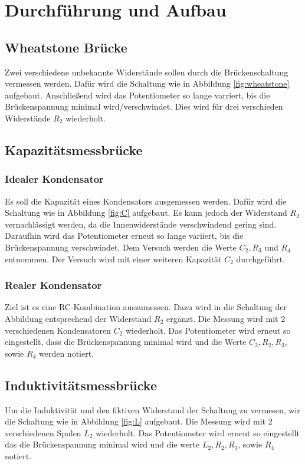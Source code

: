 \section{Durchführung und Aufbau}
\label{sec:Durchführung}

\subsection{Wheatstone Brücke}
Zwei verschiedene unbekannte Widerstände sollen durch die Brückenschaltung vermessen werden. Dafür wird die Schaltung wie in Abbildung \ref{fig:wheatstone} aufgebaut. Anschließend wird das Potentiometer so lange varriert, bis die Brückenspannung minimal wird/verschwindet. Dies wird für drei verschieden Widerstände $R_2$ wiederholt.

\subsection{Kapazitätsmessbrücke}
\subsubsection{Idealer Kondensator}
Es soll die Kapazität eines Kondensators ausgemessen werden. Dafür wird die Schaltung wie in Abbildung \ref{fig:C} aufgebaut. Es kann jedoch der Widerstand $R_2$ vernachlässigt werden, da die Innenwiderstände verschwindend gering sind. Daraufhin wird das Potentiometer erneut so lange variiert, bis die Brückenspannung verschwindet. Dem Versuch werden die Werte  $C_2, R_3$ und $R_4$ entnommen. Der Versuch wird mit einer weiteren Kapazität $C_2$ durchgeführt.

\subsubsection{Realer Kondensator}
Ziel ist es eine RC-Kombination auszumessen. Dazu wird in die Schaltung der Abbildung entsprechend der Widerstand $R_2$ ergänzt. Die Messung wird mit 2 verschiedenen Kondensatoren $C_2$ wiederholt. Das Potentiometer wird erneut so eingestellt, dass die Brückenspannung minimal wird und die Werte $C_2, R_2, R_3$, sowie $R_4$ werden notiert.

\subsection{Induktivitätsmessbrücke}
Um die Induktivität und den fiktiven Widerstand der Schaltung zu vermesen, wir die Schaltung wie in Abbildung \ref{fig:L} aufgebaut. Die Messung wird mit 2 verschiedenen Spulen $L_2$ wiederholt. Das Potentiometer wird erneut so eingestellt das die Brückenspannung minimal wird und die werte $L_2, R_2, R_3$, sowie $R_4$ notiert.

